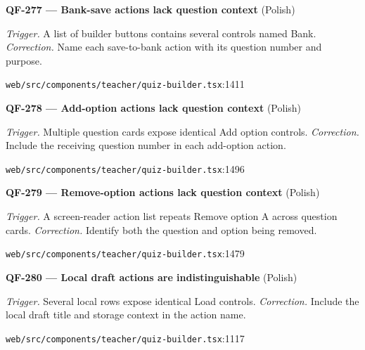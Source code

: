 \begin{minipage}{\linewidth}
\textbf{QF-277 --- Bank-save actions lack question context} {\scriptsize\color{accent}(Polish)}\par
\textit{Trigger.} A list of builder buttons contains several controls named Bank. \textit{Correction.} Name each save-to-bank action with its question number and purpose.\par
{\scriptsize\color{muted}\nolinkurl{web/src/components/teacher/quiz-builder.tsx}:1411}\par
\end{minipage}\par\vspace{7pt}
\begin{minipage}{\linewidth}
\textbf{QF-278 --- Add-option actions lack question context} {\scriptsize\color{accent}(Polish)}\par
\textit{Trigger.} Multiple question cards expose identical Add option controls. \textit{Correction.} Include the receiving question number in each add-option action.\par
{\scriptsize\color{muted}\nolinkurl{web/src/components/teacher/quiz-builder.tsx}:1496}\par
\end{minipage}\par\vspace{7pt}
\begin{minipage}{\linewidth}
\textbf{QF-279 --- Remove-option actions lack question context} {\scriptsize\color{accent}(Polish)}\par
\textit{Trigger.} A screen-reader action list repeats Remove option A across question cards. \textit{Correction.} Identify both the question and option being removed.\par
{\scriptsize\color{muted}\nolinkurl{web/src/components/teacher/quiz-builder.tsx}:1479}\par
\end{minipage}\par\vspace{7pt}
\begin{minipage}{\linewidth}
\textbf{QF-280 --- Local draft actions are indistinguishable} {\scriptsize\color{accent}(Polish)}\par
\textit{Trigger.} Several local rows expose identical Load controls. \textit{Correction.} Include the local draft title and storage context in the action name.\par
{\scriptsize\color{muted}\nolinkurl{web/src/components/teacher/quiz-builder.tsx}:1117}\par
\end{minipage}\par\vspace{7pt}
